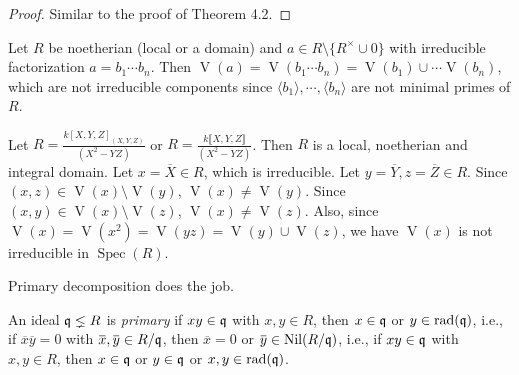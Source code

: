 \begin{proof}
    Similar to the proof of Theorem 4.2.
\end{proof}

\begin{discussion}
    Let $R$ be noetherian (local or a domain) and $a \in R \setminus \{R^{\times} \cup 0\}$ with irreducible factorization $a = b_1 \cdots b_n$. Then $\operatorname{V}(a) = \operatorname{V}(b_1 \cdots b_n) = \operatorname{V}(b_1) \cup \cdots \operatorname{V}(b_n)$, which are not irreducible components since $\langle b_1 \rangle, \cdots, \langle b_n \rangle$ are not minimal primes of $R$.
\end{discussion}

\begin{example}
    Let $R = \frac{k[X,Y,Z]_{(X,Y,Z)}}{(X^{2}-YZ)}$ or $R = \frac{k\llbracket X,Y,Z \rrbracket }{(X^{2}-YZ)}$. Then $R$ is a local, noetherian and integral domain. Let $x = \overbar{X} \in R$, which is irreducible. Let $y = \overline Y, z = \overline Z \in R$. Since $(x,z) \in \operatorname{V}(x) \setminus \operatorname{V}(y)$, $\operatorname{V}(x) \neq \operatorname{V}(y)$. Since $(x,y) \in \operatorname{V}(x) \setminus \operatorname{V}(z)$, $\operatorname{V}(x) \neq \operatorname{V}(z)$. Also, since $\operatorname{V}(x) = \operatorname{V}(x^{2}) = \operatorname{V}(yz) = \operatorname{V}(y) \cup \operatorname{V}(z)$, we have $\operatorname{V}(x)$ is not irreducible in $\operatorname{Spec}(R)$. 

\end{example}

\noindent Primary decomposition does the job.

\begin{definition}
    An ideal $\mathfrak{q} \lneq R$ is \emph{primary} if $xy \in \mathfrak{q}$ with $x,y \in R$, then $x \in \mathfrak{q}$ or $y \in \operatorname{rad}(\mathfrak{q})$, i.e., if $\overbar{x} \overbar{y} = 0$ with $\overbar{x}, \overbar{y} \in R/\ffq$, then $\overbar{x} = 0$ or $\overbar{y} \in \operatorname{Nil}(R/\ffq)$, i.e., if $xy \in \mathfrak{q}$ with $x,y \in R$, then $x \in \mathfrak{q}$ or $y \in \mathfrak{q}$ or $x,y \in \operatorname{rad}(\mathfrak{q})$.
\end{definition}

